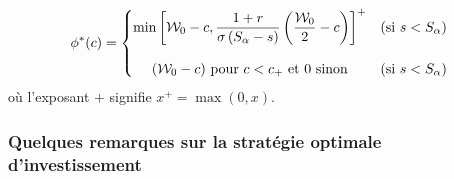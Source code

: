 \documentclass{article}
\numberwithin{equation}{section}
\begin{document}
\begin{equation}
\phi^*(c) = \left\{ 
\begin{matrix}
\displaystyle{ \min\left[ \mathcal{W}_0 - c, \frac{1+r}{\sigma\left(S_\alpha - s\right)}\left( \frac{\mathcal{W}_0}{2} - c \right) \right]^+} & \textnormal{(si }s< S_\alpha\textnormal{)}\\
~&~\\
\displaystyle{\left(\mathcal{W}_0 - c\right)} \textnormal{ pour } c<c_+ \textnormal{ et } 0  \textnormal{ sinon}& \textnormal{(si }s< S_\alpha\textnormal{)} \\
\end{matrix}
\right.
\end{equation}
où l'exposant $+$ signifie $x^+ = \max(0, x)$.

\subsubsection{Quelques remarques sur la stratégie optimale d'investissement}
\end{document}
